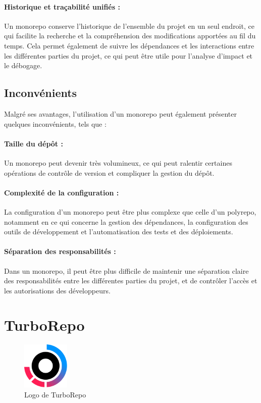 \paragraph{Historique et traçabilité unifiés :} Un monorepo conserve l'historique de l'ensemble du projet en un seul endroit, ce qui facilite la recherche et la compréhension des modifications apportées au fil du temps. Cela permet également de suivre les dépendances et les interactions entre les différentes parties du projet, ce qui peut être utile pour l'analyse d'impact et le débogage.

\subsection{Inconvénients}

Malgré ses avantages, l'utilisation d'un monorepo peut également présenter quelques inconvénients, tels que :

\paragraph{Taille du dépôt :} Un monorepo peut devenir très volumineux, ce qui peut ralentir certaines opérations de contrôle de version et compliquer la gestion du dépôt.
\paragraph{Complexité de la configuration :} La configuration d'un monorepo peut être plus complexe que celle d'un polyrepo, notamment en ce qui concerne la gestion des dépendances, la configuration des outils de développement et l'automatisation des tests et des déploiements.
\paragraph{Séparation des responsabilités :} Dans un monorepo, il peut être plus difficile de maintenir une séparation claire des responsabilités entre les différentes parties du projet, et de contrôler l'accès et les autorisations des développeurs.

\section{TurboRepo}

\begin{figure}
    \centering
    \includegraphics[width=0.2\textwidth]{assets/figures/turborepo.png}
    \caption{Logo de TurboRepo}
    \label{fig:turborepo}
\end{figure}

